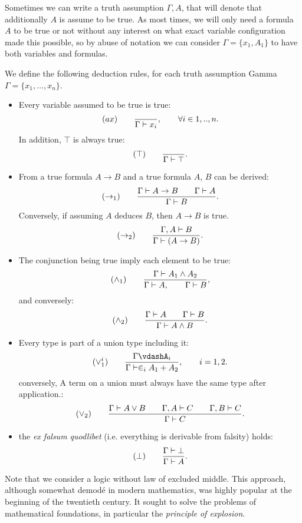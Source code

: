 Sometimes we can write a truth assumption $\Gamma, A$, that will denote that additionally $A$ is assume to be true. As most times, we will only need a formula $A$ to be true or not without any interest on what exact variable configuration made this possible, so by abuse of notation we can consider $\Gamma = \{x_1,A_1\}$ to have both variables and formulas.  
\begin{definition}
  We define the following deduction rules, for each truth assumption Gamma $\Gamma=\{x_1,...,x_n\}$.
  \begin{itemize}
    \item Every variable assumed to be true is true:
      $$  (ax)\qquad  {\displaystyle \over \Gamma \vdash x_i},\qquad \forall i \in 1,..,n.$$
      In addition, $\top$ is always true:
      $$  (\top)\qquad  {\displaystyle \over \Gamma \vdash \top}.$$
\item From a true formula $A\to B$ and a true formula $A$, $B$ can be derived:
  $$(\to_1)\qquad  {\displaystyle \Gamma \vdash A\to B\qquad \Gamma \vdash A      \over \Gamma \vdash B}.$$
  Conversely, if assuming $A$ deduces $B$, then $A\to B$ is true.
$$(\to_2)\qquad  {\displaystyle \Gamma, A \vdash B      \over \Gamma \vdash (A\to B)}.$$
  
\item The conjunction being true imply each element to be true:
  $$(\land_1) \qquad {\displaystyle \Gamma\vdash A_1\land A_2 \over \Gamma \vdash A, \qquad \Gamma \vdash B },$$
and conversely:
  $$(\land_2) \qquad {\displaystyle \Gamma\vdash A\qquad \Gamma\vdash B \over \Gamma \vdash  A \land B}.$$
\item Every type is part of a union type including it:
    $$  (\lor_1^i)\qquad  {\displaystyle\Gamma \vdashA_i \over \Gamma \vdash \in_i A_1+A_2},\qquad  i=  1,2.$$
  conversely, A term on a union must always have the same type after application.:
    $$(\lor_2) \qquad {\displaystyle \Gamma\vdash A\lor B\qquad \Gamma, A\vdash C\qquad \Gamma, B\vdash C \over \Gamma \vdash C}.$$
  \item the \emph{ex falsum quodlibet} (i.e. everything is derivable from falsity)  holds:
    $$  (\bot)\qquad  {\displaystyle\Gamma \vdash \bot \over \Gamma \vdash A}.$$ 

\end{itemize}
\end{definition}



Note that we consider a logic without law of excluded middle. This approach, although somewhat demodé in modern mathematics, was highly popular at the beginning of the twentieth century. It sought to solve the problems of mathematical foundations, in particular the \emph{principle of explosion}. \\


